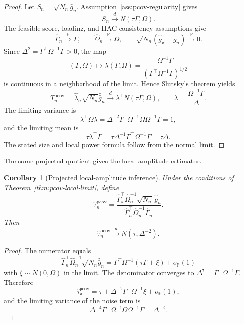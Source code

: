 \documentclass[11pt,a4paper]{amsart}
\theoremstyle{plain}
\newtheorem{corollary}[theorem]{Corollary}
\theoremstyle{definition}
\theoremstyle{remark}
\newcommand{\PP}{\mathbb{P}}
\newcommand{\toP}{\xrightarrow{\PP}}
\newcommand{\toD}{\xrightarrow{d}}
\begin{document}
\begin{proof}
Let \(S_n=\sqrt{N_n}\bar g_n\).  Assumption~\ref{ass:pcov-regularity} gives
\[
        S_n\toD N(\tau\Gamma,\Omega).
\]
The feasible score, loading, and HAC consistency assumptions give
\[
        \widehat\Gamma_n\toP\Gamma,
        \qquad
        \widehat\Omega_n\toP\Omega,
        \qquad
        \sqrt{N_n}(\widehat{\bar g}_n-\bar g_n)\toP 0.
\]
Since \(\Delta^2=\Gamma^\top\Omega^{-1}\Gamma>0\), the map
\[
        (\Gamma,\Omega)
        \mapsto
        \lambda(\Gamma,\Omega)
        =
        \frac{\Omega^{-1}\Gamma}{(\Gamma^\top\Omega^{-1}\Gamma)^{1/2}}
\]
is continuous in a neighborhood of the limit.  Hence Slutsky's theorem yields
\[
        T_n^{\mathrm{pcov}}
        =
        \widehat\lambda_n^\top\sqrt{N_n}\widehat{\bar g}_n
        \toD
        \lambda^\top N(\tau\Gamma,\Omega),
        \qquad
        \lambda=\frac{\Omega^{-1}\Gamma}{\Delta}.
\]
The limiting variance is
\[
        \lambda^\top\Omega\lambda
        =
        \Delta^{-2}\Gamma^\top\Omega^{-1}\Omega\Omega^{-1}\Gamma
        =
        1,
\]
and the limiting mean is
\[
        \tau\lambda^\top\Gamma
        =
        \tau\Delta^{-1}\Gamma^\top\Omega^{-1}\Gamma
        =
        \tau\Delta.
\]
The stated size and local power formula follow from the normal limit.
\end{proof}

The same projected quotient gives the local-amplitude estimator.

\begin{corollary}[Projected local-amplitude inference]\label{cor:pcov-tau}
Under the conditions of Theorem~\ref{thm:pcov-local-limit}, define
\[
        \widehat\tau_n^{\mathrm{pcov}}
        =
        \frac{
        \widehat\Gamma_n^\top\widehat\Omega_n^{-1}
        \sqrt{N_n}\,\widehat{\bar g}_n
        }{
        \widehat\Gamma_n^\top\widehat\Omega_n^{-1}\widehat\Gamma_n
        }.
\]
Then
\[
        \widehat\tau_n^{\mathrm{pcov}}
        \toD
        N(\tau,\Delta^{-2}).
\]
\end{corollary}

\begin{proof}
The numerator equals
\[
        \widehat\Gamma_n^\top\widehat\Omega_n^{-1}
        \sqrt{N_n}\widehat{\bar g}_n
        =
        \Gamma^\top\Omega^{-1}(\tau\Gamma+\xi)+o_{\PP}(1)
\]
with \(\xi\sim N(0,\Omega)\) in the limit.  The denominator converges to
\(\Delta^2=\Gamma^\top\Omega^{-1}\Gamma\).  Therefore
\[
        \widehat\tau_n^{\mathrm{pcov}}
        =
        \tau+
        \Delta^{-2}\Gamma^\top\Omega^{-1}\xi+o_{\PP}(1),
\]
and the limiting variance of the noise term is
\[
        \Delta^{-4}\Gamma^\top\Omega^{-1}\Omega\Omega^{-1}\Gamma
        =
        \Delta^{-2}.
\]
\end{proof}
\end{document}
